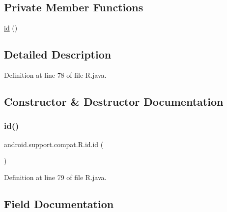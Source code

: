\subsection*{Private Member Functions}
\begin{DoxyCompactItemize}
\item 
\mbox{\hyperlink{classandroid_1_1support_1_1compat_1_1_r_1_1id_aee040e2b824155ed725d5b50afb8f2ec}{id}} ()
\end{DoxyCompactItemize}


\subsection{Detailed Description}


Definition at line 78 of file R.\+java.



\subsection{Constructor \& Destructor Documentation}
\mbox{\label{classandroid_1_1support_1_1compat_1_1_r_1_1id_aee040e2b824155ed725d5b50afb8f2ec}} 
\subsubsection{\texorpdfstring{id()}{id()}}
{\footnotesize\ttfamily android.\+support.\+compat.\+R.\+id.\+id (\begin{DoxyParamCaption}{ }\end{DoxyParamCaption})\hspace{0.3cm}{\ttfamily [private]}}



Definition at line 79 of file R.\+java.


\begin{DoxyCode}{0}

\end{DoxyCode}


\subsection{Field Documentation}
\mbox{\label{classandroid_1_1support_1_1compat_1_1_r_1_1id_a7f80213ff3a91ef547ef997845e107fa}} 
